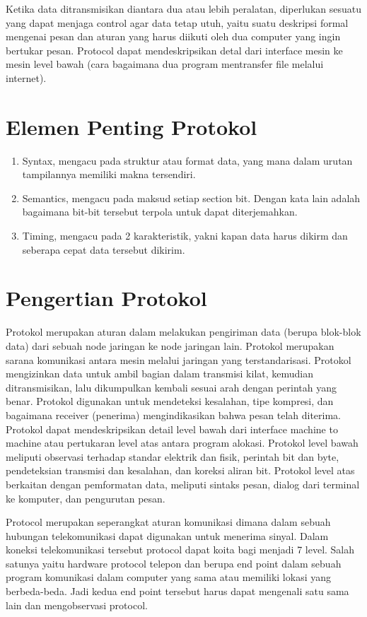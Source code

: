  Ketika data ditransmisikan diantara dua atau lebih peralatan, diperlukan sesuatu yang dapat menjaga control agar data tetap utuh, yaitu 
 suatu deskripsi formal mengenai pesan dan aturan yang harus diikuti oleh dua computer yang ingin bertukar pesan. Protocol dapat 
 mendeskripsikan detal dari interface mesin ke mesin level bawah (cara bagaimana dua program mentransfer file melalui internet).
 
 \section{Elemen Penting Protokol}
 \begin{enumerate}
 \item  Syntax, mengacu pada struktur atau format data, yang mana dalam urutan tampilannya memiliki makna tersendiri.
 \item  Semantics, mengacu pada maksud setiap section bit. Dengan kata lain adalah bagaimana bit-bit tersebut terpola untuk dapat 
 diterjemahkan.
 \item  Timing, mengacu pada 2 karakteristik, yakni kapan data harus dikirm dan seberapa cepat data tersebut dikirim.
 \end{enumerate}

 
 \section{Pengertian Protokol}
Protokol merupakan aturan dalam melakukan pengiriman data (berupa blok-blok data) dari sebuah node jaringan ke node jaringan lain.
Protokol merupakan sarana komunikasi antara mesin melalui jaringan yang terstandarisasi. Protokol mengizinkan data untuk ambil bagian 
dalam transmisi kilat, kemudian ditransmisikan, lalu dikumpulkan kembali sesuai arah dengan perintah yang benar. 
Protokol digunakan untuk mendeteksi kesalahan, tipe kompresi, dan bagaimana receiver (penerima) mengindikasikan bahwa pesan telah 
diterima. 
Protokol dapat mendeskripsikan detail level bawah dari interface machine to machine atau pertukaran level atas antara program alokasi. 
Protokol level bawah meliputi observasi terhadap standar elektrik dan fisik, perintah bit dan byte, pendeteksian transmisi dan 
kesalahan, dan koreksi aliran bit. 
Protokol level atas berkaitan dengan pemformatan data, meliputi sintaks pesan, dialog dari terminal ke komputer, dan pengurutan pesan. 

Protocol merupakan seperangkat aturan komunikasi dimana dalam sebuah hubungan telekomunikasi dapat digunakan untuk menerima sinyal. 
Dalam  koneksi telekomunikasi tersebut protocol dapat  koita bagi menjadi 7 level. Salah satunya yaitu hardware protocol telepon dan 
berupa end point dalam sebuah program komunikasi dalam computer yang sama atau memiliki lokasi yang berbeda-beda. Jadi kedua end point 
tersebut harus dapat mengenali satu sama lain dan mengobservasi protocol.

